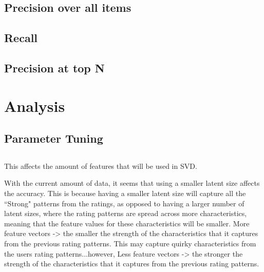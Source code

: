 \subsection{Precision over all items}

\subsection{Recall}

\subsection{Precision at top N}


\section{Analysis}
\subsection{Parameter Tuning}

\subsection{}
This affects the amount of features that will be used in SVD.

With the current amount of data, it seems that using a smaller latent size affects the accuracy. This is because having a smaller latent size will capture all the ``Strong" patterns from the ratings, as opposed to having a larger number of latent sizes, where the rating patterns are spread across more characteristics, meaning that the feature values for these characteristics will be smaller. More feature vectors -> the smaller the strength of the characteristics that it captures from the previous rating patterns. This may capture quirky characteristics from the users rating patterns...however, Less feature vectors -> the stronger the strength of the characteristics that it captures from the previous rating patterns. 


